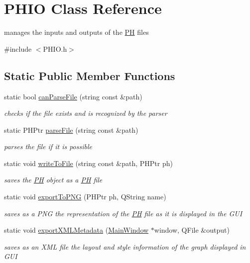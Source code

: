\hypertarget{class_p_h_i_o}{\section{\-P\-H\-I\-O \-Class \-Reference}
\label{class_p_h_i_o}
}


manages the inputs and outputs of the \hyperlink{class_p_h}{\-P\-H} files  




{\ttfamily \#include $<$\-P\-H\-I\-O.\-h$>$}

\subsection*{\-Static \-Public \-Member \-Functions}
\begin{DoxyCompactItemize}
\item 
static bool \hyperlink{class_p_h_i_o_a264cd5b35169906843e829a13cbcc09d}{can\-Parse\-File} (string const \&path)
\begin{DoxyCompactList}\small\item\em checks if the file exists and is recognized by the parser \end{DoxyCompactList}\item 
static \-P\-H\-Ptr \hyperlink{class_p_h_i_o_afeb84bb5b7960b8a4733b7345d2db025}{parse\-File} (string const \&path)
\begin{DoxyCompactList}\small\item\em parses the file if it is possible \end{DoxyCompactList}\item 
static void \hyperlink{class_p_h_i_o_a8a33a5a439f19caf0619ab7132642846}{write\-To\-File} (string const \&path, \-P\-H\-Ptr ph)
\begin{DoxyCompactList}\small\item\em saves the \hyperlink{class_p_h}{\-P\-H} object as a \hyperlink{class_p_h}{\-P\-H} file \end{DoxyCompactList}\item 
static void \hyperlink{class_p_h_i_o_a612f877c6332f9d20d6ef8992c1681f3}{export\-To\-P\-N\-G} (\-P\-H\-Ptr ph, \-Q\-String name)
\begin{DoxyCompactList}\small\item\em saves as a \-P\-N\-G the representation of the \hyperlink{class_p_h}{\-P\-H} file as it is displayed in the \-G\-U\-I \end{DoxyCompactList}\item 
static void \hyperlink{class_p_h_i_o_acfdd11c04c1a729812857ea563803938}{export\-X\-M\-L\-Metadata} (\hyperlink{class_main_window}{\-Main\-Window} $\ast$window, \-Q\-File \&output)
\begin{DoxyCompactList}\small\item\em saves as an \-X\-M\-L file the layout and style information of the graph displayed in \-G\-U\-I \end{DoxyCompactList}\end{DoxyCompactItemize}


